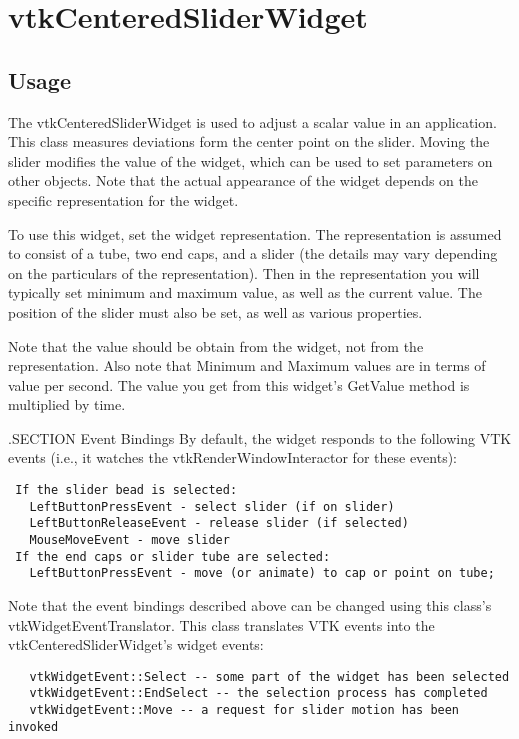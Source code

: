 \section{vtkCenteredSliderWidget}

\subsection{Usage}

 The vtkCenteredSliderWidget is used to adjust a scalar value in an application.
 This class measures deviations form the center point on the slider.
 Moving the slider
 modifies the value of the widget, which can be used to set parameters on
 other objects. Note that the actual appearance of the widget depends on
 the specific representation for the widget.
 
 To use this widget, set the widget representation. The representation is
 assumed to consist of a tube, two end caps, and a slider (the details may
 vary depending on the particulars of the representation). Then in the
 representation you will typically set minimum and maximum value, as well
 as the current value. The position of the slider must also be set, as well
 as various properties.

 Note that the value should be obtain from the widget, not from the
 representation. Also note that Minimum and Maximum values are in terms of
 value per second. The value you get from this widget's GetValue method is
 multiplied by time.

 .SECTION Event Bindings
 By default, the widget responds to the following VTK events (i.e., it
 watches the vtkRenderWindowInteractor for these events):
 \begin{verbatim}
 If the slider bead is selected:
   LeftButtonPressEvent - select slider (if on slider)
   LeftButtonReleaseEvent - release slider (if selected)
   MouseMoveEvent - move slider
 If the end caps or slider tube are selected:
   LeftButtonPressEvent - move (or animate) to cap or point on tube;
 \end{verbatim}

 Note that the event bindings described above can be changed using this
 class's vtkWidgetEventTranslator. This class translates VTK events 
 into the vtkCenteredSliderWidget's widget events:
 \begin{verbatim}
   vtkWidgetEvent::Select -- some part of the widget has been selected
   vtkWidgetEvent::EndSelect -- the selection process has completed
   vtkWidgetEvent::Move -- a request for slider motion has been invoked
 \end{verbatim}

